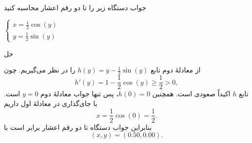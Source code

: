 \def\-{\raisebox{.75pt}{-}}

جواب دستگاه زیر را تا دو رقم اعشار محاسبه کنید
\begin{center}
$
    \begin{cases}
    x = \frac{1}{2} \cos(y) \\
    y = \frac{1}{2} \sin(y)
    \end{cases}
$
\end{center}

\begingroup\color{blue}
حل

از معادلهٔ دوم تابع
\(h(y)=y-\frac{1}{2}\sin(y)\)
را در نظر می‌گیریم. چون
\[
 h'(y)=1-\frac{1}{2}\cos(y)\geq\frac{1}{2}>0,
\]
تابع \(h\) اکیداً صعودی است. همچنین \(h(0)=0\)، پس تنها جواب معادلهٔ دوم
\(y=0\)
است. با جای‌گذاری در معادلهٔ اول داریم
\[
 x=\frac{1}{2}\cos(0)=\frac{1}{2}.
\]
بنابراین جواب دستگاه تا دو رقم اعشار برابر است با
\[
 (x,y)=(0.50,0.00).
\]
\endgroup
